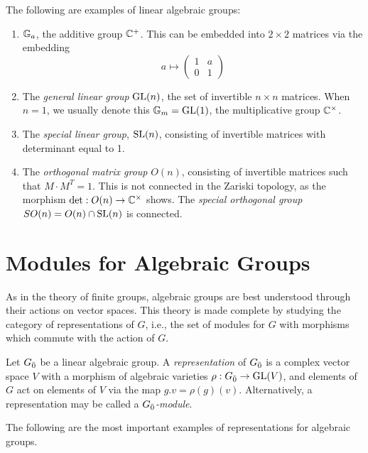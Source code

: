 \begin{example} \label{ex:lag}
  The following are examples of linear algebraic groups:
  \begin{enumerate}
  \item $\mathbb{G}_a$, the additive group $\mathbb{C}^+$. This can be embedded into $2 \times 2$ matrices via the embedding
    \[
      a \mapsto
      \begin{pmatrix}
        1 & a \\
        0 & 1
      \end{pmatrix}
    \]
  \item The \emph{general linear group} $\operatorname{GL}(n)$, the set of invertible $n \times n$ matrices. When $n = 1$, we usually denote this $\mathbb{G}_m = \operatorname{GL}(1)$, the multiplicative group $\mathbb{C}^\times$.
  \item The \emph{special linear group}, $\operatorname{SL}(n)$, consisting of invertible matrices with determinant equal to 1.
  \item The \emph{orthogonal matrix group} $O(n)$, consisting of invertible matrices such that \mbox{$M \cdot M^T = 1$}. This is not connected in the Zariski topology, as the morphism $\det: O(n) \to \mathbb{C}^\times$ shows. The \emph{special orthogonal group} $SO(n) = O(n) \cap \operatorname{SL}(n)$ is connected.
  \end{enumerate}
\end{example}

\section{Modules for Algebraic Groups}
\label{sec:group-modules}

As in the theory of finite groups, algebraic groups are best understood through their actions on vector spaces. This theory is made complete by studying the category of representations of $G$, i.e., the set of modules for $G$ with morphisms which commute with the action of $G$.

\begin{definition}
  Let ${G}_{\bar{0}}$ be a linear algebraic group. A \emph{representation} of ${G}_{\bar{0}}$ is a complex vector space $V$ with a morphism of algebraic varieties $\rho: {G}_{\bar{0}} \to \operatorname{GL}(V)$, and elements of $G$ act on elements of $V$ via the map $g.v = \rho(g)(v)$. Alternatively, a representation may be called a \emph{${G}_{\bar{0}}$-module}.
\end{definition}

The following are the most important examples of representations for algebraic groups.

